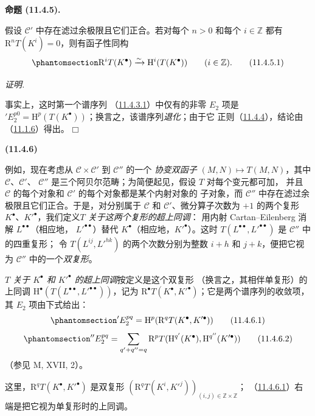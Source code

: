 \documentclass[UTF8,fontset=none,11pt,oneside,openany]{ctexbook}
\providecommand{\square}{\mdlgwhtsquare}
\newenvironment{env}[1][]{%
  \par\medskip\noindent\textbf{(#1)}\ %
}{\par}
\newenvironment{proposition}[1][]{%
  \par\medskip\noindent\textbf{命题 (#1).}\ %
}{\par}
\newenvironment{proof}{%
  \par\smallskip\noindent\textit{证明.}\ %
}{\hfill$\square$\par}
\newcommand{\oldpage}[2][]{%
  \hypertarget{ega-source-page-#1-#2}{}%
  \marginnote{\scriptsize\textbf{#1}~|~#2}\ignorespaces}
\let\EGAOriginalLabel\label
\renewcommand{\label}[1]{\phantomsection\EGAOriginalLabel{#1}}
\begin{document}
\begin{proposition}[11.4.5]
\label{0.11.4.5-fr}
假设 $\mathcal C'$ 中存在滤过余极限且它们正合。若对每个 $n>0$ 和每个
$i\in\mathbb Z$ 都有 $\mathrm R^nT(K^i)=0$，则有函子性同构
\[
  \label{0.11.4.5.1-fr}
  \mathrm R^iT(K^\bullet)\xrightarrow{\sim}
  \mathrm H^i(T(K^\bullet))\qquad(i\in\mathbb Z).
  \tag{11.4.5.1}
\]
\end{proposition}

\begin{proof}
事实上，这时第一个谱序列
（\hyperref[0.11.4.3.1-fr]{11.4.3.1}）中仅有的非零 $E_2$ 项是
$'E_2^{p0}=\mathrm H^p(T(K^\bullet))$；换言之，该谱序列\emph{退化}；由于它
正则（\hyperref[0.11.4.4-fr]{11.4.4}），结论由
（\hyperref[0.11.1.6-fr]{11.1.6}）得出。
\end{proof}

\begin{env}[11.4.6]
\label{0.11.4.6-fr}
例如，现在考虑从 $\mathcal C\times\mathcal C'$ 到 $\mathcal C''$ 的一个
\emph{协变双函子} $(M,N)\mapsto T(M,N)$，其中 $\mathcal C$、$\mathcal C'$、
$\mathcal C''$ 是三个阿贝尔范畴；为简便起见，假设 $T$ 对每个变元都可加，
并且 $\mathcal C$ 的每个对象和 $\mathcal C'$ 的每个对象都是某个内射对象的
子对象，而 $\mathcal C''$ 中存在滤过余极限且它们正合。于是，对分别属于
$\mathcal C$ 和 $\mathcal C'$、微分算子次数为 $+1$ 的两个复形
$K^\bullet$、$K'^\bullet$，我们定义\emph{$T$ 关于这两个复形的超上同调}：
用内射 Cartan--Eilenberg 消解 $L^{\bullet\bullet}$（相应地，
$L'^{\bullet\bullet}$）替代 $K^\bullet$（相应地，$K'^\bullet$）。这时
$T(L^{\bullet\bullet},L'^{\bullet\bullet})$ 是 $\mathcal C''$ 中的四重复形；
令 $T(L^{ij},L'^{hk})$ 的两个次数分别为整数 $i+h$ 和 $j+k$，便把它视为
$\mathcal C''$ 中的一个\emph{双复形}。

\emph{$T$ 关于 $K^\bullet$ 和 $K'^\bullet$ 的超上同调}按定义是这个双复形
（换言之，其相伴单复形）的上同调
$\mathrm H^\bullet(T(L^{\bullet\bullet},L'^{\bullet\bullet}))$，记为
$\mathrm R^\bullet T(K^\bullet,K'^\bullet)$；它是两个谱序列的收敛项，其
$E_2$ 项由下式给出：
\oldpage[0\textsubscript{III}]{35}
\[
  \label{0.11.4.6.1-fr}
  'E_2^{pq}=\mathrm H^p(\mathrm R^qT(K^\bullet,K'^\bullet))
  \tag{11.4.6.1}
\]
\[
  \label{0.11.4.6.2-fr}
  ''E_2^{pq}=\sum_{q'+q''=q}
  \mathrm R^pT(\mathrm H^{q'}(K^\bullet),\mathrm H^{q''}(K'^\bullet))
  \tag{11.4.6.2}
\]
（参见 M, XVII, 2）。

这里，$\mathrm R^qT(K^\bullet,K'^\bullet)$ 是双复形
$(\mathrm R^qT(K^i,K'^j))_{(i,j)\in\mathbb Z\times\mathbb Z}$；
（\hyperref[0.11.4.6.1-fr]{11.4.6.1}）右端是把它视为单复形时的上同调。


\end{env}
\end{document}
